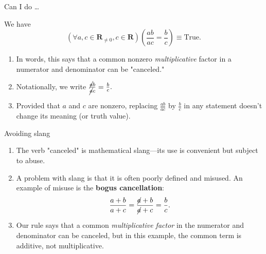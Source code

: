 \documentclass[portrait,fleqn,12pt]{beamer}
\newcommand{\reals}{\mathbf{R}}
\newenvironment{handlist}
   {\begin{enumerate}[\faHandPointRight]
       \addtolength{\itemsep}{0.0\itemsep}}
     {\end{enumerate}}
\begin{document}
\begin{frame}{Can I do \dots}

\begin{theorem} We have 
\begin{equation*} 
   \left(\forall a, c\in \reals_{\neq 0}, c \in \reals \right)\left(\frac{a b}{a c} = \frac{b}{c} \right) \equiv \text{True}.
  \end{equation*}
\end{theorem}

\begin{handlist}
\item In words, this says that a common nonzero \emph{multiplicative} factor in a numerator and denominator can be "canceled."
\item Notationally, we write 
$
\frac{\cancel{a} b}{ \cancel{a} c}  = \frac{b}{c}.
$
\item Provided that $a$ and $c$ are nonzero, replacing $\frac{ab}{ac}$ by $\frac{b}{c}$ in any statement doesn't change its meaning (or truth value).
\end{handlist}

\end{frame}

\begin{frame}{Avoiding slang}

\begin{handlist}

\item The verb "canceled" is mathematical slang—its use is convenient but subject to abuse.  
\item A problem with slang is that it is often poorly defined and misused. An example of misuse is the \textbf{bogus cancellation}:
\begin{equation*}
   \frac{a+b}{a+c} =  \frac{\cancel{a}+b}{\cancel{a} +c} = \frac{b}{c}.
\end{equation*}
\item Our rule says that a common \emph{multiplicative factor} in the numerator and denominator can be canceled, but in this example, the common term is additive, not multiplicative.
\end{handlist}

\end{frame}
\end{document}
